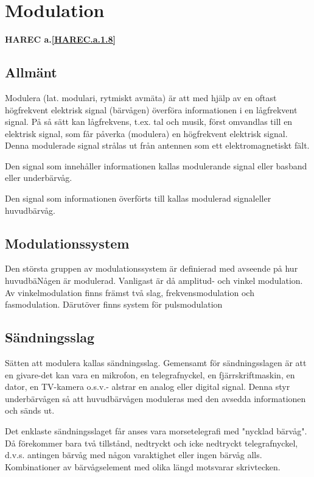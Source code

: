 \section{Modulation}
\textbf{HAREC a.\ref{HAREC.a.1.8}\label{myHAREC.a.1.8}}

\subsection{Allmänt}

Modulera (lat. modulari, rytmiskt avmäta) är att med hjälp av en oftast högfrekvent
elektrisk signal (bärvågen) överföra informationen i en lågfrekvent signal. På så sätt kan
lågfrekvens, t.ex. tal och musik, först omvandlas till en elektrisk signal, som får 
påverka (modulera) en högfrekvent elektrisk signal. Denna modulerade signal strålas ut från
antennen som ett elektromagnetiskt fält.

Den signal som innehåller informationen kallas modulerande signal eller basband eller
underbärvåg.

Den signal som informationen överförts till kallas modulerad signaleller huvudbärvåg.

\subsection{Modulationssystem}

Den största gruppen av modulationssystem är definierad med avseende på hur huvudbäNågen är
modulerad. Vanligast är då amplitud- och vinkel modulation. Av vinkelmodulation finns
främst två slag, frekvensmodulation och fasmodulation. Därutöver finns system för
pulsmodulation

\subsection{Sändningsslag}

Sätten att modulera kallas sändningsslag. Gemensamt för sändningsslagen är att en
givare-det kan vara en mikrofon, en telegrafnyckel, en fjärrskriftmaskin, en dator, en
TV-kamera o.s.v.- alstrar en analog eller digital signal. Denna styr underbärvågen så att
huvudbärvågen moduleras med den avsedda informationen och sänds ut.

Det enklaste sändningsslaget får anses vara morsetelegrafi med "nycklad bärvåg".
Då förekommer bara två tillstånd, nedtryckt och icke nedtryckt telegrafnyckel, d.v.s.
antingen bärvåg med någon varaktighet eller ingen bärvåg alls. Kombinationer av
bärvågselement med olika längd motsvarar skrivtecken.

